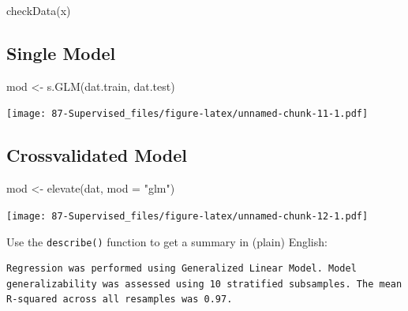 \documentclass[
]{book}
\newenvironment{Shaded}{\begin{snugshade}}{\end{snugshade}}
\newcommand{\AttributeTok}[1]{\textcolor[rgb]{0.77,0.63,0.00}{#1}}
\newcommand{\FunctionTok}[1]{\textcolor[rgb]{0.00,0.00,0.00}{#1}}
\newcommand{\NormalTok}[1]{#1}
\newcommand{\OtherTok}[1]{\textcolor[rgb]{0.56,0.35,0.01}{#1}}
\newcommand{\SpecialCharTok}[1]{\textcolor[rgb]{0.00,0.00,0.00}{#1}}
\newcommand{\StringTok}[1]{\textcolor[rgb]{0.31,0.60,0.02}{#1}}
\begin{document}
\begin{Shaded}
\begin{Highlighting}[]
\FunctionTok{checkData}\NormalTok{(x)}
\end{Highlighting}
\end{Shaded}

\hypertarget{single-model}{%
\subsection{Single Model}\label{single-model}}

\begin{Shaded}
\begin{Highlighting}[]
\NormalTok{mod }\OtherTok{\textless{}{-}} \FunctionTok{s.GLM}\NormalTok{(dat.train, dat.test)}
\end{Highlighting}
\end{Shaded}

\texttt{[image: 87-Supervised\_files/figure-latex/unnamed-chunk-11-1.pdf]}

\hypertarget{crossvalidated-model}{%
\subsection{Crossvalidated Model}\label{crossvalidated-model}}

\begin{Shaded}
\begin{Highlighting}[]
\NormalTok{mod }\OtherTok{\textless{}{-}} \FunctionTok{elevate}\NormalTok{(dat, }\AttributeTok{mod =} \StringTok{"glm"}\NormalTok{)}
\end{Highlighting}
\end{Shaded}

\texttt{[image: 87-Supervised\_files/figure-latex/unnamed-chunk-12-1.pdf]}

Use the \texttt{describe()} function to get a summary in (plain) English:

\begin{Shaded}
\end{Shaded}

\begin{verbatim}
Regression was performed using Generalized Linear Model. Model generalizability was assessed using 10 stratified subsamples. The mean R-squared across all resamples was 0.97.
\end{verbatim}
\end{document}
